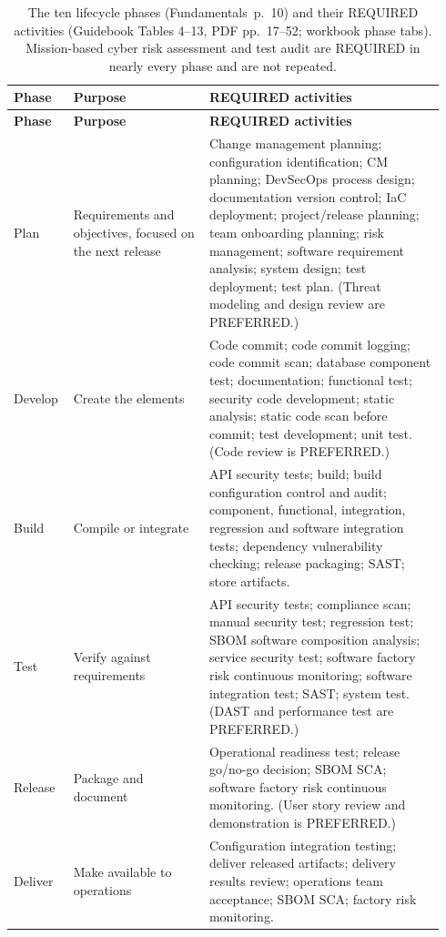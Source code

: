 \documentclass[11pt,letterpaper,twoside,openany]{memoir}
\newcommand{\pg}[2]{{\small(#1~p.~#2)}}          %
\begin{document}
\begin{longtable}{@{}L{0.12\linewidth}L{0.30\linewidth}L{0.52\linewidth}@{}}
\caption{The ten lifecycle phases \pg{Fundamentals}{10} and their REQUIRED activities (Guidebook Tables 4--13,
PDF pp.~17--52; workbook phase tabs). Mission-based cyber risk assessment and test audit are REQUIRED in nearly every
phase and are not repeated.}\label{tab:phases}\\
\toprule \sffamily\bfseries Phase & \sffamily\bfseries Purpose & \sffamily\bfseries REQUIRED activities\\ \midrule\endfirsthead
\toprule \sffamily\bfseries Phase & \sffamily\bfseries Purpose & \sffamily\bfseries REQUIRED activities\\ \midrule\endhead
\bottomrule\endfoot
Plan & Requirements and objectives, focused on the next release & Change management planning; configuration identification; CM planning; DevSecOps process design; documentation version control; IaC deployment; project/release planning; team onboarding planning; risk management; software requirement analysis; system design; test deployment; test plan. (Threat modeling and design review are PREFERRED.)\\
Develop & Create the elements & Code commit; code commit logging; code commit scan; database component test; documentation; functional test; security code development; static analysis; static code scan before commit; test development; unit test. (Code review is PREFERRED.)\\
Build & Compile or integrate & API security tests; build; build configuration control and audit; component, functional, integration, regression and software integration tests; dependency vulnerability checking; release packaging; SAST; store artifacts.\\
Test & Verify against requirements & API security tests; compliance scan; manual security test; regression test; SBOM software composition analysis; service security test; software factory risk continuous monitoring; software integration test; SAST; system test. (DAST and performance test are PREFERRED.)\\
Release & Package and document & Operational readiness test; release go/no-go decision; SBOM SCA; software factory risk continuous monitoring. (User story review and demonstration is PREFERRED.)\\
Deliver & Make available to operations & Configuration integration testing; deliver released artifacts; delivery results review; operations team acceptance; SBOM SCA; factory risk monitoring.\\

\end{longtable}
\end{document}

